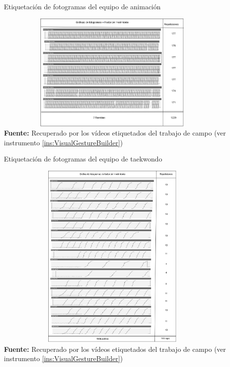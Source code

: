 \begin{chart}[H]
	\caption{Etiquetaci\'on de fotogramas del equipo de animaci\'on}
	\label{fig:etiquetaCheerleader}
	\centering
	\includegraphics[width=445px,height=220px]{graphics/resultados/GraSegCheerleaders.PNG} \\
	\textbf{Fuente:} Recuperado por los v\'ideos etiquetados del trabajo de campo (ver instrumento \ref{ins:VisualGestureBuilder})
\end{chart}
\begin{chart}[H]
	\caption{Etiquetaci\'on de fotogramas del equipo de taekwondo}
	\label{fig:etiquetaTaekwondo}
	\centering
	\includegraphics[width=445px,height=350px]{graphics/resultados/GraSegTaekwondo.PNG} \\
	\textbf{Fuente:} Recuperado por los v\'ideos etiquetados del trabajo de campo (ver instrumento \ref{ins:VisualGestureBuilder})
\end{chart}

